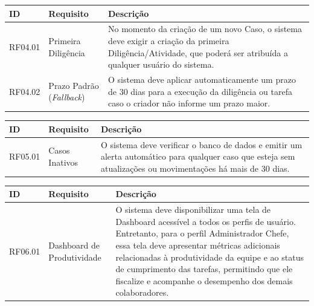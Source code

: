 \begin{quadro}[H]
\centering
\caption{Requisitos Funcionais - Módulo 04: Central de Diligências, Atividades e Prazos}
\label{qua:rf-modulo04}
\renewcommand{\arraystretch}{1.3}
\begin{tabularx}{\textwidth}{|l|l|X|}
\hline
\textbf{ID} & \textbf{Requisito} & \textbf{Descrição} \\
\hline
RF04.01 & Primeira Diligência & No momento da criação de um novo Caso, o sistema deve exigir a criação da primeira Diligência/Atividade, que poderá ser atribuída a qualquer usuário do sistema. \\
\hline
RF04.02 & Prazo Padrão (\textit{Fallback}) & O sistema deve aplicar automaticamente um prazo de 30 dias para a execução da diligência ou tarefa caso o criador não informe um prazo maior. \\
\hline
\hline
\end{tabularx}
\end{quadro}

\begin{quadro}[H]
\centering
\caption{Requisitos Funcionais - Módulo 05: Notificações e Alertas}
\label{qua:rf-modulo05}
\renewcommand{\arraystretch}{1.3}
\begin{tabularx}{\textwidth}{|l|l|X|}
\hline
\textbf{ID} & \textbf{Requisito} & \textbf{Descrição} \\
\hline
RF05.01 & Casos Inativos & O sistema deve verificar o banco de dados e emitir um alerta automático para qualquer caso que esteja sem atualizações ou movimentações há mais de 30 dias. \\
\hline
\end{tabularx}
\end{quadro}

\begin{quadro}[H]
\centering
\caption{Requisitos Funcionais - Módulo 06: Painel Gerencial (Indicadores)}
\label{qua:rf-modulo06}
\renewcommand{\arraystretch}{1.3}
\begin{tabularx}{\textwidth}{|l|l|X|}
\hline
\textbf{ID} & \textbf{Requisito} & \textbf{Descrição} \\
\hline
RF06.01 & Dashboard de Produtividade & O sistema deve disponibilizar uma tela de Dashboard acessível a todos os perfis de usuário. Entretanto, para o perfil Administrador Chefe, essa tela deve apresentar métricas adicionais relacionadas à produtividade da equipe e ao status de cumprimento das tarefas, permitindo que ele fiscalize e acompanhe o desempenho dos demais colaboradores. \\
\hline
\end{tabularx}
\end{quadro}

